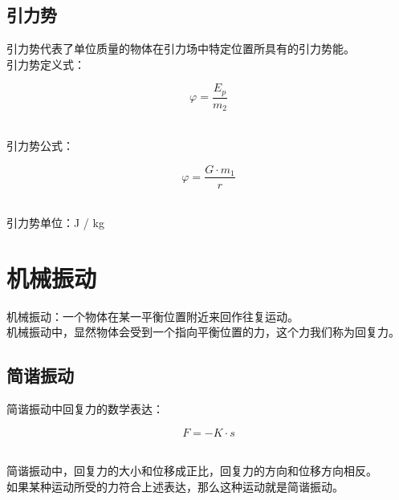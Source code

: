\documentclass[UTF8]{ctexart}
\begin{document}
\subsection{引力势}
    引力势代表了单位质量的物体在引力场中特定位置所具有的引力势能。\\[3mm]
    引力势定义式：\vspace{3pt}
    \begin{large}
        \begin{equation*}
            \varphi=\frac{E_p}{m_2}
        \end{equation*}
    \end{large}\\
    引力势公式：\vspace{3pt}
    \begin{large}
        \begin{equation*}
            \varphi=\frac{G\cdot m_{1}}{r}
        \end{equation*}
    \end{large}\\
    引力势单位：J / kg

\newpage

\section{机械振动}
    机械振动：一个物体在某一平衡位置附近来回作往复运动。\\[3mm]
    机械振动中，显然物体会受到一个指向平衡位置的力，这个力我们称为回复力。

\subsection{简谐振动}
    简谐振动中回复力的数学表达：
    \begin{large}
        \begin{equation*}
            F=-K\cdot s
        \end{equation*}
    \end{large}\\
    简谐振动中，回复力的大小和位移成正比，回复力的方向和位移方向相反。\\[3mm]
    如果某种运动所受的力符合上述表达，那么这种运动就是简谐振动。
\end{document}
